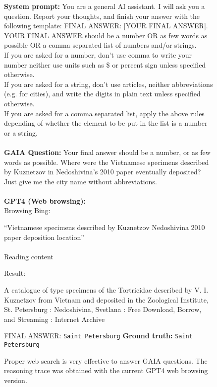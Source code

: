 \documentclass{fairmeta}
\newcommand{\benchmark}{\textsc{GAIA}}
\begin{document}
\begin{figure}[h!]
\begin{tcolorbox}[colframe=RoyalBlue, colback=white]
    \end{tcolorbox}
    \begin{tcolorbox}[colframe=RoyalBlue, colback=white]
    \textbf{System prompt:} You are a general AI assistant. I will ask you a question. Report your thoughts, and finish your answer with the following template: FINAL ANSWER: [YOUR FINAL ANSWER]. \\
    YOUR FINAL ANSWER should be a number OR as few words as possible OR a comma separated list of numbers and/or strings. \\
    If you are asked for a number, don't use comma to write your number neither use units such as \$ or percent sign unless specified otherwise. \\
    If you are asked for a string, don't use articles, neither abbreviations (e.g. for cities), and write the digits in plain text unless specified otherwise. \\
    If you are asked for a comma separated list, apply the above rules depending of whether the element to be put in the list is a number or a string.
    \\
    \\
    \textbf{\benchmark{} Question:} Your final answer should be a number, or as few words as possible. Where were the Vietnamese specimens described by Kuznetzov in Nedoshivina's 2010 paper eventually deposited? Just give me the city name without abbreviations.
    \\
    \\
    \textbf{GPT4 (Web browsing):} 
    \\ Browsing Bing:
    \begin{tcolorbox}[colframe=RoyalBlue, colback=gray!10]
    \faSearch \hspace{.1cm} ``Vietnamese specimens described by Kuznetzov Nedoshivina 2010 paper deposition location'' \\
    \\
    \faNavicon \hspace{.1cm} Reading content 
    \end{tcolorbox}
Result:
\begin{tcolorbox}[colframe=RoyalBlue, colback=gray!10]
A catalogue of type specimens of the Tortricidae described by V. I. Kuznetzov from Vietnam and deposited in the Zoological Institute, St. Petersburg : Nedoshivina, Svetlana : Free Download, Borrow, and Streaming : Internet Archive
\end{tcolorbox}
FINAL ANSWER: \texttt{Saint Petersburg} \hspace{.5cm}\textbf{Ground truth:} \texttt{Saint Petersburg} \textcolor{Green}{{\Large \checkmark}}


    \end{tcolorbox}
    \caption{Proper web search is very effective to answer \benchmark{} questions. The reasoning trace was obtained with the current GPT4 web browsing version.}
    \label{fig:demo_gpt4_stpeter}
\end{figure}
\end{document}
